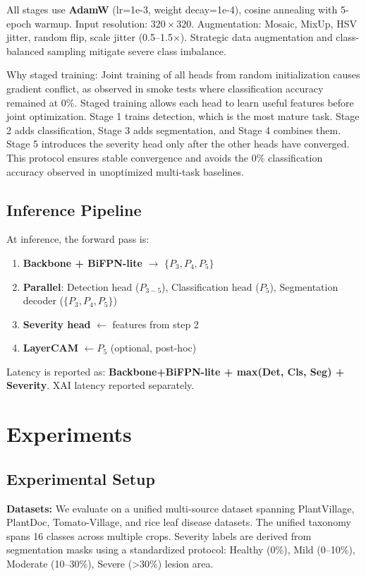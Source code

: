 \documentclass[10pt,a4paper,twocolumn]{article}
\begin{document}
All stages use \textbf{AdamW} (lr=1e-3, weight decay=1e-4), cosine annealing with 5-epoch warmup. Input resolution: $320 \times 320$. Augmentation: Mosaic, MixUp, HSV jitter, random flip, scale jitter (0.5--1.5$\times$). Strategic data augmentation and class-balanced sampling mitigate severe class imbalance.

Why staged training: Joint training of all heads from random initialization causes gradient conflict, as observed in smoke tests where classification accuracy remained at 0\%. Staged training allows each head to learn useful features before joint optimization. Stage 1 trains detection, which is the most mature task. Stage 2 adds classification, Stage 3 adds segmentation, and Stage 4 combines them. Stage 5 introduces the severity head only after the other heads have converged. This protocol ensures stable convergence and avoids the 0\% classification accuracy observed in unoptimized multi-task baselines.

\subsection{Inference Pipeline}

At inference, the forward pass is:
\begin{enumerate}
    \item \textbf{Backbone + BiFPN-lite} $\rightarrow$ $\{P_3, P_4, P_5\}$
    \item \textbf{Parallel}: Detection head ($P_{3-5}$), Classification head ($P_5$), Segmentation decoder ($\{P_3, P_4, P_5\}$)
    \item \textbf{Severity head} $\leftarrow$ features from step 2
    \item \textbf{LayerCAM} $\leftarrow P_5$ (optional, post-hoc)
\end{enumerate}

Latency is reported as: \textbf{Backbone+BiFPN-lite + max(Det, Cls, Seg) + Severity}. XAI latency reported separately.

\section{Experiments}
\label{sec:experiments}

\subsection{Experimental Setup}

\textbf{Datasets:} We evaluate on a unified multi-source dataset spanning PlantVillage, PlantDoc, Tomato-Village, and rice leaf disease datasets. \cite{li2025crosscrop} The unified taxonomy spans 16 classes across multiple crops. Severity labels are derived from segmentation masks using a standardized protocol: Healthy (0\%), Mild (0--10\%), Moderate (10--30\%), Severe (>30\%) lesion area.
\end{document}
